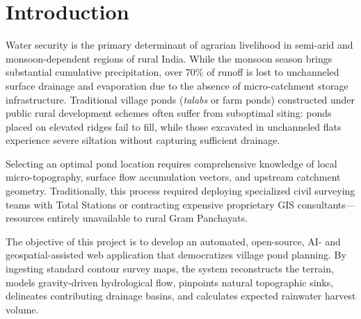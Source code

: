 \documentclass[manuscript,screen]{acmart}
\begin{document}

\maketitle

\section{Introduction}
\label{sec:intro}
Water security is the primary determinant of agrarian livelihood in semi-arid and monsoon-dependent regions of rural India. While the monsoon season brings substantial cumulative precipitation, over 70\% of runoff is lost to unchanneled surface drainage and evaporation due to the absence of micro-catchment storage infrastructure. Traditional village ponds (\emph{talabs} or farm ponds) constructed under public rural development schemes often suffer from suboptimal siting: ponds placed on elevated ridges fail to fill, while those excavated in unchanneled flats experience severe siltation without capturing sufficient drainage.

Selecting an optimal pond location requires comprehensive knowledge of local micro-topography, surface flow accumulation vectors, and upstream catchment geometry. Traditionally, this process required deploying specialized civil surveying teams with Total Stations or contracting expensive proprietary GIS consultants---resources entirely unavailable to rural Gram Panchayats. 

The objective of this project is to develop an automated, open-source, AI- and geospatial-assisted web application that democratizes village pond planning. By ingesting standard contour survey maps, the system reconstructs the terrain, models gravity-driven hydrological flow, pinpoints natural topographic sinks, delineates contributing drainage basins, and calculates expected rainwater harvest volume.
\end{document}

